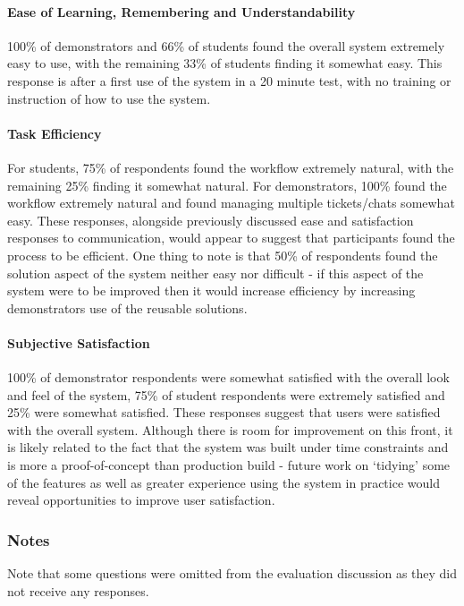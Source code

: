     \paragraph{Ease of Learning, Remembering and Understandability} 100\% of demonstrators and 66\% of students found the overall system extremely easy to use, with the remaining 33\% of students finding it somewhat easy. This response is after a first use of the system in a 20 minute test, with no training or instruction of how to use the system.
    
    \paragraph{Task Efficiency} For students, 75\% of respondents found the workflow extremely natural, with the remaining 25\% finding it somewhat natural. 
    For demonstrators, 100\% found the workflow extremely natural and found managing multiple tickets/chats somewhat easy. 
    These responses, alongside previously discussed ease and satisfaction responses to communication, would appear to suggest that participants found the process to be efficient. One thing to note is that 50\% of respondents found the solution aspect of the system neither easy nor difficult - if this aspect of the system were to be improved then it would increase efficiency by increasing demonstrators use of the reusable solutions.
    
    \paragraph{Subjective Satisfaction} 100\% of demonstrator respondents were somewhat satisfied with the overall look and feel of the system, 75\% of student respondents were extremely satisfied and 25\% were somewhat satisfied. 
    These responses suggest that users were satisfied with the overall system. Although there is room for improvement on this front, it is likely related to the fact that the system was built under time constraints and is more a proof-of-concept than production build - future work on `tidying' some of the features as well as greater experience using the system in practice would reveal opportunities to improve user satisfaction.

\subsubsection{Notes}

Note that some questions were omitted from the evaluation discussion as they did not receive any responses.

